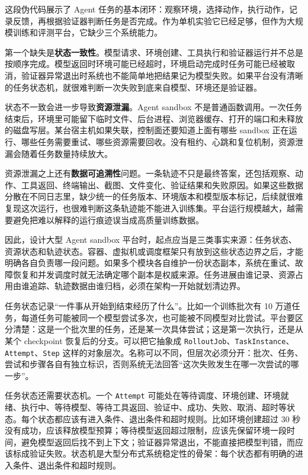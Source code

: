 这段伪代码展示了 Agent 任务的基本闭环：观察环境，选择动作，执行动作，记录反馈，再根据验证器判断任务是否完成。作为单机实验它已经足够，但作为大规模训练和评测平台，它缺少三个系统能力。

第一个缺失是\textbf{状态一致性}。模型请求、环境创建、工具执行和验证器运行并不总是按顺序完成。模型返回时环境可能已经超时，环境启动完成时任务可能已经被取消，验证器异常退出时系统也不能简单地把结果记为模型失败。如果平台没有清晰的任务状态机，就很难判断一次失败到底来自模型、环境还是验证器。

状态不一致会进一步导致\textbf{资源泄漏}。Agent sandbox 不是普通函数调用。一次任务结束后，环境里可能留下临时文件、后台进程、浏览器缓存、打开的端口和未释放的磁盘写层。某台宿主机如果失联，控制面还要知道上面有哪些 sandbox 正在运行、哪些任务需要重试、哪些资源需要回收。没有租约、心跳和复位机制，资源泄漏会随着任务数量持续放大。

资源泄漏之上还有\textbf{数据可追溯性}问题。一条轨迹不只是最终答案，还包括观察、动作、工具返回、终端输出、截图、文件变化、验证结果和失败原因。如果这些数据分散在不同日志里，缺少统一的任务版本、环境版本和模型版本标记，后续就很难复现这次运行，也很难判断这条轨迹能不能进入训练集。平台运行规模越大，越需要避免把难以解释的运行痕迹误当成高质量训练数据。

因此，设计大型 Agent sandbox 平台时，起点应当是三类事实来源：任务状态、资源状态和轨迹状态。容器、虚拟机或调度框架只有放到这些状态边界之后，才能明确各自负责哪一段问题。如果多个模块各自维护一份状态副本，系统在重试、故障恢复和并发调度时就无法确定哪个副本是权威来源。任务进展由谁记录、资源占用由谁追踪、轨迹数据由谁归档，必须在架构一开始就划清边界。

任务状态记录“一件事从开始到结束经历了什么”。比如一个训练批次有 10 万道任务，每道任务可能被同一个模型尝试多次，也可能被不同模型对比尝试。平台要区分清楚：这是一个批次里的任务，还是某一次具体尝试；这是第一次执行，还是从某个 checkpoint 恢复后的分支。可以把它抽象成 \texttt{RolloutJob}、\texttt{TaskInstance}、\texttt{Attempt}、\texttt{Step} 这样的对象层次。名称可以不同，但层次必须分开：批次、任务、尝试和步骤各自有独立标识，否则系统无法回答“这次失败发生在哪一次尝试的哪一步”。

任务状态还需要状态机。一个 \texttt{Attempt} 可能处在等待调度、环境创建、环境就绪、执行中、等待模型、等待工具返回、验证中、成功、失败、取消、超时等状态。每个状态都应该有进入条件、退出条件和超时规则。比如环境创建超过 30 秒没有成功，应该释放模型预算；等待模型返回超过限制，应该先保留环境一段时间，避免模型返回后找不到上下文；验证器异常退出，不能直接把模型判错，而应该标成验证失败。状态机是大型分布式系统稳定性的骨架：每个状态都有明确的进入条件、退出条件和超时规则。

